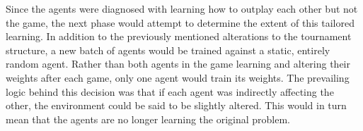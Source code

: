 Since the agents were diagnosed with learning how to outplay each other
but not the game,
the next phase would attempt to determine the extent of this tailored learning.
%
In addition to the previously mentioned alterations to the tournament structure,
a new batch of agents would be trained against a static, entirely random agent.
%
Rather than both agents in the game learning and altering their weights after
each game,
only one agent would train its weights.
%
The prevailing logic behind this decision was that if each agent was indirectly
affecting the other,
the environment could be said to be slightly altered.
%
This would in turn mean that the agents are no longer learning the original
problem.

